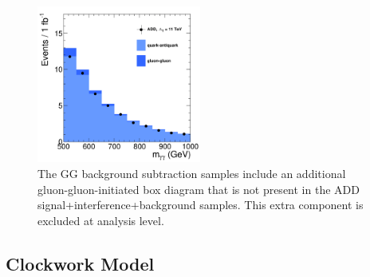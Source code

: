 \begin{figure}[tbp!]
\begin{center}
\includegraphics[angle=0,width=0.48\textwidth]{fig/GG_bkg_sub-1.png}
\end{center}
\caption{The GG background subtraction samples include an additional gluon-gluon-initiated box diagram that is not present in the ADD signal+interference+background samples. This extra component is excluded at analysis level.
}
\label{fig:ADDsignal_and_GG}
\end{figure}




\subsection{Clockwork Model}


